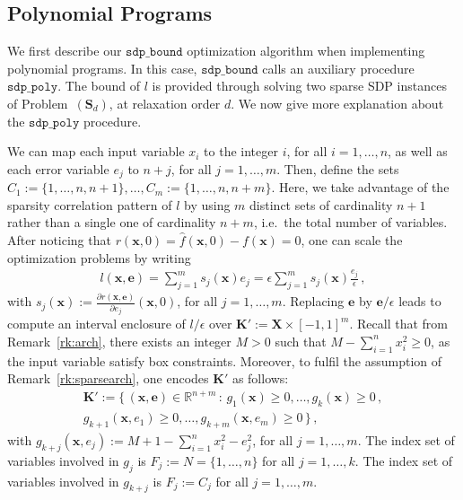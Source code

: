 \documentclass[preprint]{sigplanconf}
\newcommand{\R}{\mathbb{R}}
\newcommand{\x}{\mathbf{x}}
\newcommand{\e}{\mathbf{e}}
\def\S{\mathbf{S}}
\def\K{\mathbf{K}}
\def\S{\mathbf{S}}
\def\X{\mathbf{X}}
\newcommand{\sdpbound}{\mathtt{sdp\_bound}}
\newcommand{\sdppoly}{\mathtt{sdp\_poly}}
\theoremstyle{plain}
\begin{document}
\subsection{Polynomial Programs}
\label{sec:polsdp}
%
We first describe our $\sdpbound$ optimization algorithm when implementing polynomial programs. In this case, $\sdpbound$ calls an auxiliary procedure $\sdppoly$.
The bound of $l$ is provided through solving two sparse SDP instances of Problem~$(\S_d)$, at relaxation order $d$. We now give more explanation about the $\sdppoly$ procedure.

We can map each input variable $x_i$ to the integer $i$, for all $i=1,\dots,n$, as well as each error variable $e_j$ to $n+j$, for all $j=1,\dots,m$. Then, define the sets $C_1 := \{1,\dots,n,n+1\}, \dots, C_m := \{1,\dots,n,n+m\}$. Here, we take advantage of the sparsity correlation pattern of $l$ by using $m$ distinct sets of cardinality $n+1$ rather than a single one of cardinality $n+m$, i.e.~the total number of variables. 
After noticing that $r(\x,0) = \hat{f}(\x,0) - f(\x) = 0$, one can scale the optimization problems by writing 
\begin{align}
\label{eq:lscale}
l(\x,\e) = \sum_{j=1}^m s_j (\x) e_j = \epsilon \sum_{j=1}^m s_j (\x) \frac{e_j}{\epsilon} \,,
\end{align}
%
with $s_j(\x) := \frac{\partial r(\x,\e)} {\partial e_j} (\x,0)$, for all $j=1,\dots,m$. Replacing $\e$ by $\e/\epsilon$ leads to compute an interval enclosure of $l/\epsilon$ over $\K' := \X \times [-1, 1]^m$.
Recall that from Remark~\ref{rk:arch}, there exists an integer $M > 0$ such that $M - \sum_{i=1}^n x_i^2 \geq 0$, as the input variable satisfy box constraints.
Moreover, to fulfil the assumption of Remark~\ref{rk:sparsearch},  one encodes $\K'$ as follows: 
\begin{align*}
\K' := \{\, (\x,\e) \in \R^{n+m} \, : \, g_1 (\x) \geq 0, \dots, g_k(\x) \geq 0 \,, \\
g_{k+1}(\x,e_1) \geq 0, \dots, g_{k+m} (\x, e_m) \geq 0 \,\} \,,
\end{align*}
%
with $g_{k+j}(\x, e_j) := M + 1 -  \sum_{i=1}^n x_i^2 - e_j^2$, for all $j=1,\dots, m$. 
The index set of variables involved in $g_j$ is $F_j := N = \{1, \dots, n\}$ for all $j=1, \dots, k$. 
The index set of variables involved in $g_{k+j}$ is $F_j := C_j$ for all $j=1, \dots, m$. 
\end{document}
